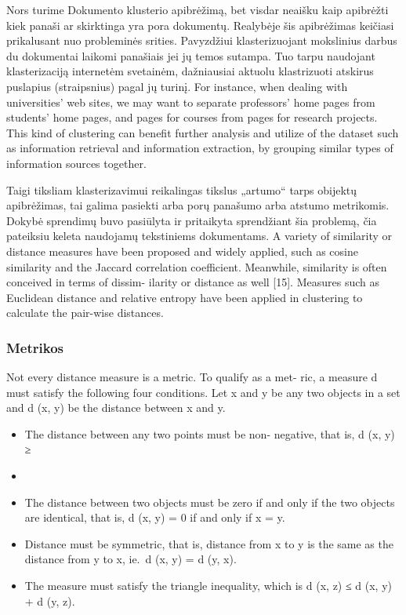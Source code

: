 \documentclass{VUMIFInfKursinis}
\begin{document}
		Nors turime Dokumento klusterio apibrėžimą, bet visdar neaišku kaip apibrėžti kiek panaši ar skirktinga yra pora dokumentų. Realybėje šis apibrėžimas keičiasi prikalusant nuo probleminės srities. Pavyzdžiui klasterizuojant mokslinius darbus du dokumentai laikomi panašiais jei jų temos sutampa. Tuo tarpu naudojant klasterizaciją internetėm svetainėm, dažniausiai aktuolu klastrizuoti atskirus puslapius (straipsnius) pagal jų turinį.
		For instance, when dealing with universities’ web sites, we may want to separate professors’ home pages from students’ home pages, and pages for courses from pages for research projects. This kind of clustering can benefit further analysis and utilize of the dataset such as information retrieval and information extraction, by grouping similar types of information sources together.

		Taigi tiksliam klasterizavimui reikalingas tikslus „artumo“ tarps obijektų apibrėžimas, tai galima pasiekti arba porų panašumo arba atstumo metrikomis. Dokybė sprendimų buvo pasiūlyta ir pritaikyta sprendžiant šia problemą, čia pateiksiu keleta naudojamų tekstiniems dokumentams.
		A variety of similarity or distance measures have been proposed and widely applied, such as cosine similarity and the Jaccard correlation coefficient.  Meanwhile, similarity is often conceived in terms of dissim- ilarity or distance as well [15]. Measures such as Euclidean distance and relative entropy have been applied in clustering to calculate the pair-wise distances.

		\subsubsection{Metrikos}
		Not every distance measure is a metric. To qualify as a met- ric, a measure d must satisfy the following four conditions.  Let x and y be any two objects in a set and d (x, y) be the distance between x and y.
		\begin{itemize}
			\item The distance between any two points must be non- negative, that is, d (x, y) ≥ \item
			\item The distance between two objects must be zero if and only if the two objects are identical, that is, d (x, y) = 0 if and only if x = y.
			\item Distance must be symmetric, that is, distance from x to y is the same as the distance from y to x, ie.\  d (x, y) = d (y, x).
			\item The measure must satisfy the triangle inequality, which is d (x, z) ≤ d (x, y) + d (y, z).
		\end{itemize}
\end{document}
